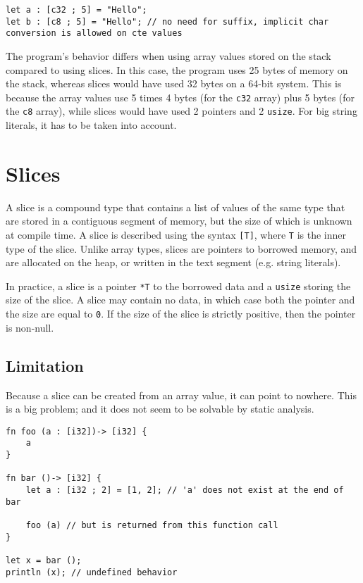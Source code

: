 \begin{lstlisting}[style=coloredverbatim]
let a : [c32 ; 5] = "Hello";
let b : [c8 ; 5] = "Hello"; // no need for suffix, implicit char conversion is allowed on cte values
\end{lstlisting}

The program's behavior differs when using array values stored on the stack
compared to using slices. In this case, the program uses 25 bytes of memory on
the stack, whereas slices would have used 32 bytes on a 64-bit system. This is
because the array values use 5 times 4 bytes (for the \texttt{c32} array) plus 5
bytes (for the \texttt{c8} array), while slices would have used 2 pointers and 2
\texttt{usize}. For big string literals, it has to be taken into account.

\section{Slices}%
\label{sec:slices}

A slice is a compound type that contains a list of values of the same type that
are stored in a contiguous segment of memory, but the size of which is unknown
at compile time. A slice is described using the syntax \texttt{[T]}, where
\texttt{T} is the inner type of the slice. Unlike array types, slices are
pointers to borrowed memory, and are allocated on the heap, or written in the
text segment (e.g. string literals).

In practice, a slice is a pointer \texttt{*T} to the borrowed data and a
\texttt{usize} storing the size of the slice. A slice may contain no data, in
which case both the pointer and the size are equal to \texttt{0}. If the size of
the slice is strictly positive, then the pointer is non-null.

\subsection{Limitation}%
\label{sec:slice_lim}

Because a slice can be created from an array value, it can point to nowhere.
This is a big problem; and it does not seem to be solvable by static analysis.

\begin{lstlisting}[style=coloredverbatim]
fn foo (a : [i32])-> [i32] {
    a
}

fn bar ()-> [i32] {
    let a : [i32 ; 2] = [1, 2]; // 'a' does not exist at the end of bar

    foo (a) // but is returned from this function call
}

let x = bar ();
println (x); // undefined behavior
\end{lstlisting}


